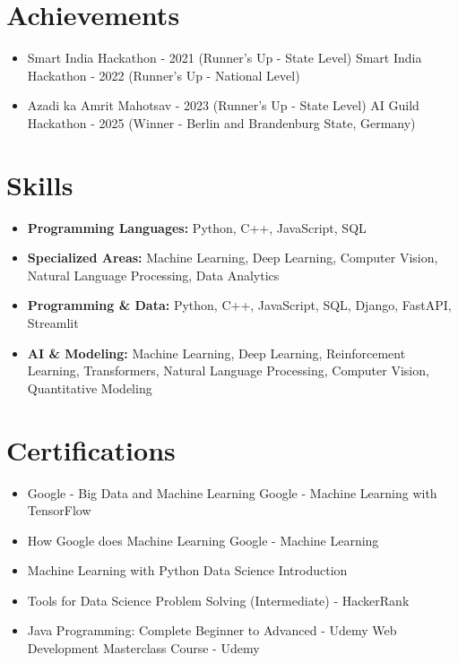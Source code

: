 \documentclass[a4paper,10pt]{article}
\begin{document}
\section*{Achievements}
\begin{itemize}
\item Smart India Hackathon - 2021 (Runner's Up - State Level) \hfill Smart India Hackathon - 2022 (Runner's Up - National Level)
\item Azadi ka Amrit Mahotsav - 2023 (Runner's Up - State Level) \hfill AI Guild Hackathon - 2025 (Winner - Berlin and Brandenburg State, Germany)
\end{itemize}

\section*{Skills}
\begin{itemize}
  \item \textbf{Programming Languages:} Python, C++, JavaScript, SQL
  \item \textbf{Specialized Areas:} Machine Learning, Deep Learning, Computer Vision, Natural Language Processing, Data Analytics
  \item \textbf{Programming \& Data:} Python, C++, JavaScript, SQL, Django, FastAPI, Streamlit
  \item \textbf{AI \& Modeling:} Machine Learning, Deep Learning, Reinforcement Learning, Transformers, Natural Language Processing, Computer Vision, Quantitative Modeling
\end{itemize}

\section*{Certifications}
\begin{itemize}
\item Google - Big Data and Machine Learning \hfill Google - Machine Learning with TensorFlow
\item How Google does Machine Learning \hfill Google - Machine Learning
\item Machine Learning with Python \hfill Data Science Introduction
\item Tools for Data Science \hfill Problem Solving (Intermediate) - HackerRank
\item Java Programming: Complete Beginner to Advanced - Udemy \hfill Web Development Masterclass Course - Udemy
\end{itemize}
\end{document}
